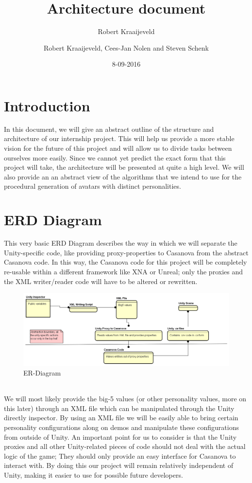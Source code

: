 \documentclass{article}
\title{Architecture document}
\date{8-09-2016}
\author{Robert Kraaijeveld}
\author{Robert Kraaijeveld, Cees-Jan Nolen and Steven Schenk}
\begin{document}
  \maketitle
  \newpage
  \tableofcontents

  \newpage
  \section{Introduction}
  In this document, we will give an abstract outline of the structure and architecture of our internship project. 
  This will help us provide a more stable vision for the future of this project and will allow us to divide tasks between ourselves more easily.
  Since we cannot yet predict the exact form that this project will take, the architecture will be presented at quite a high level. We will also
  provide an an abstract view of the algorithms that we intend to use for the procedural generation of avatars with distinct personalities.


  \newpage
  \section{ERD Diagram}
  This very basic ERD Diagram describes the way in which we will separate the Unity-specific code, like providing proxy-properties to Casanova from the abstract Casanova code. In this way, the Casanova code for this project will be completely re-usable within a different framework like XNA or Unreal; only the proxies and the XML writer/reader code will have to be altered or rewritten.

  \begin{figure}[h]
	\includegraphics[width=1.4\textwidth]{ER.png}
	\caption{ER-Diagram}
	\label{fig:figure2}
  \end{figure}

  ~\\
  We will most likely provide the big-5 values (or other personality values, more on this later) through an XML file which can be manipulated through the Unity directly inspector. By using an XML file we will be easily able to bring certain personality configurations along on demos and manipulate these configurations from outside of Unity. An important point for us to consider is that the Unity proxies and all other Unity-related pieces of code should not deal with the actual logic of the game; They should only provide an easy interface for Casanova to interact with. By doing this our project will remain relatively independent of Unity, making it easier to use for possible future developers.
\end{document}

